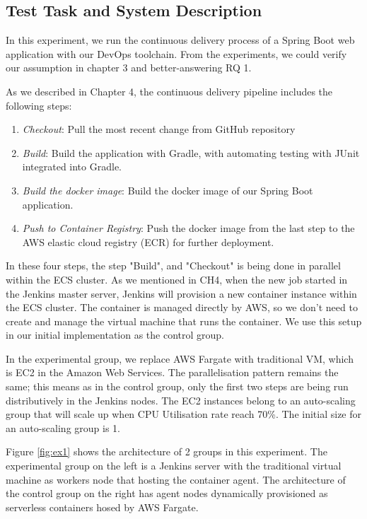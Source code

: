 \subsection{Test Task and System Description}
In this experiment, we run the continuous delivery process of a Spring Boot web application with our DevOps toolchain. From the experiments, we could verify our assumption in chapter 3 and better-answering RQ 1.
\par
As we described in Chapter 4, the continuous delivery pipeline includes the following steps:
\begin{enumerate}
\item \textit{Checkout}: Pull the most recent change from GitHub repository
\item \textit{Build}: Build the application with Gradle, with automating testing with JUnit integrated into Gradle.
\item \textit{Build the docker image}: Build the docker image of our Spring Boot application.
\item \textit{Push to Container Registry}: Push the docker image from the last step to the AWS elastic cloud registry (ECR) for further deployment.
\end{enumerate}
\par
In these four steps, the step "Build", and "Checkout" is being done in parallel within the ECS cluster. As we mentioned in CH4, when the new job started in the Jenkins master server, Jenkins will provision a new container instance within the ECS cluster. The container is managed directly by AWS, so we don't need to create and manage the virtual machine that runs the container. We use this setup in our initial implementation as the control group.
\par
In the experimental group, we replace AWS Fargate with traditional VM, which is EC2 in the Amazon Web Services. The parallelisation pattern remains the same; this means as in the control group, only the first two steps are being run distributively in the Jenkins nodes. The EC2 instances belong to an auto-scaling group that will scale up when CPU Utilisation rate reach 70\%. The initial size for an auto-scaling group is 1.
\par
Figure \ref{fig:ex1} shows the architecture of 2 groups in this experiment. The experimental group on the left is a Jenkins server with the traditional virtual machine as workers node that hosting the container agent. The architecture of the control group on the right has agent nodes dynamically provisioned as serverless containers hosed by AWS Fargate.
